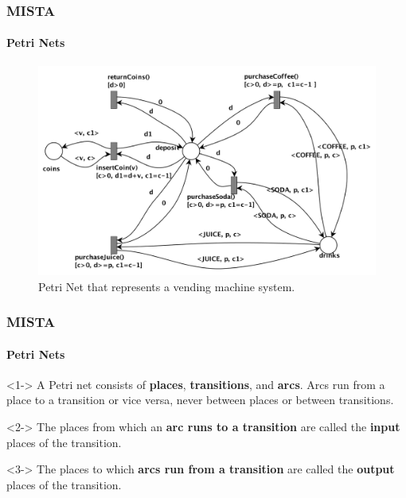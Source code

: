 \documentclass[notes]{beamer}
\begin{document}
\begin{frame}
  \vspace{-20.5pt}
  \frametitle{MISTA}
  \vspace{-20.5pt}
  \framesubtitle{Petri Nets}
  \begin{figure}
    \centering
    \includegraphics[scale=0.4]{petri-net.png}
    \caption{Petri Net that represents a vending machine system.}
    \label{fig:finite-state-machine}
  \end{figure}
\end{frame}

\begin{frame}
  \frametitle{MISTA}
  \framesubtitle{Petri Nets}
  \begin{definition}<1->
    A Petri net consists of \textbf{places}, \textbf{transitions}, and \textbf{arcs}. Arcs run from a place to a transition or vice versa, never between places or between transitions.
  \end{definition}
  \begin{block}{}<2->
    The places from which an \textbf{arc runs to a transition} are called the \textbf{input} places of the transition.
  \end{block}
  \begin{block}{}<3->
  The places to which \textbf{arcs run from a transition} are called the \textbf{output} places of the transition.
  \end{block}
\end{frame}
\end{document}

